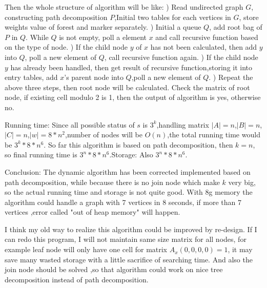 \documentclass{article}
\begin{document}
Then the whole structure of algorithm will be like:
) Read undirected graph $G$, constructing path decomposition $P$,Initial two tables for each vertices in $G$, store weights value of forest and marker separately.
) Initial a queue $Q$, add root bag of $P$ in $Q$. While $Q$ is not empty, poll a element $x$ and call recursive function based on the type of node.
) If the child node $y$ of $x$ has not been calculated, then add $y$ into $Q$, poll a new element of $Q$, call recursive function again.
) If the child node $y$ has already been handled, then get result of recursive function,storing it into entry tables, add $x$'s parent node into $Q$,poll a new element of $Q$.
) Repeat the above three steps, then root node will be calculated. Check the matrix of root node, if existing cell modulo 2 is 1, then the output of algorithm is yes, otherwise no.

\noindent Running time:
Since all possible status of $s$ is $3^k$,handling matrix $|A|=n$,$|B|=n$,$|C|=n$,$|w|=8*n^2$,number of nodes will be $O(n)$,the total running time would be $3^k*8*n^6$. So far this algorithm is based on path decomposition, then $k=n$, so final running time is $3^n*8*n^6$.Storage: Also $3^n*8*n^6$.

\noindent Conclusion:
The dynamic algorithm has been corrected implemented based on path decomposition, while because there is no join node which make $k$ very big, so the actual running time and storage is not quite good. With 8g memory the algorithm could handle a graph with 7 vertices in 8 seconds, if more than 7 vertices ,error called "out of heap memory" will happen.

\noindent I think my old way to realize this algorithm could be improved by re-design. If I can redo this program, I will not maintain same size matrix for all nodes, for example leaf node will only have one cell for matrix $A_x(0,0,0,0)=1$, it may save many wasted storage with a little sacrifice of searching time. And also the join node should be solved ,so that algorithm could work on nice tree decomposition instead of path decomposition.
\end{document}
